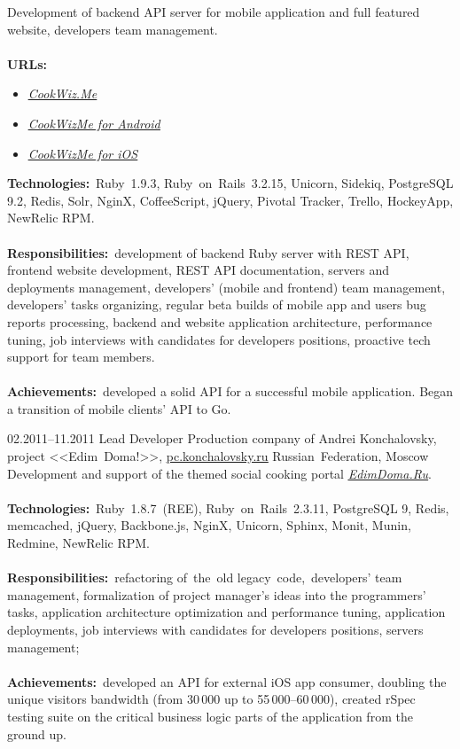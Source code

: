 \documentclass[12pt,a4paper,final]{moderncv}
\begin{document}
{
  Development of backend API server for mobile application and full featured website, developers team management.
  \\\\
  \textbf{URLs:}
  \begin{itemize}
    \item \underline{\href{https://cookwiz.me/}{\itshape CookWiz.Me}}
    \item \underline{\href{https://play.google.com/store/apps/details?id=com.cookwizme}{\itshape CookWizMe for Android}}
    \item \underline{\href{https://itunes.apple.com/app/id605764643}{\itshape CookWizMe for iOS}}
  \end{itemize}
  \bigskip
  \textbf{Technologies:}~Ruby~1.9.3, Ruby~on~Rails~3.2.15, Unicorn, Sidekiq, PostgreSQL 9.2, Redis, Solr, NginX, CoffeeScript, jQuery, Pivotal Tracker, Trello, HockeyApp, NewRelic RPM.
  \\\\
  \textbf{Responsibilities:}~development of backend Ruby server with REST API, frontend website development, REST API documentation, servers and deployments management, developers' (mobile and frontend) team management, developers' tasks organizing, regular beta builds of mobile app and users bug reports processing, backend and website application architecture, performance tuning, job interviews with candidates for developers positions, proactive tech support for team members.
  \\\\
  \textbf{Achievements:}~developed a solid API for a successful mobile application. Began a transition of mobile clients' API to Go.
}
%
\cventry
{02.2011--11.2011}
{Lead Developer}
{
  Production company of Andrei Konchalovsky, project <<Edim~Doma!>>, \underline{\href{http://pc.konchalovsky.ru}{pc.konchalovsky.ru}}
}
{Russian~Federation, Moscow}
{}
{
  Development and support of the themed social cooking portal \underline{\href{http://www.edimdoma.ru}{\itshape EdimDoma.Ru}}.
  \\\\
  \textbf{Technologies:}~Ruby~1.8.7~(REE), Ruby~on~Rails~2.3.11, PostgreSQL 9, Redis, memcached, jQuery, Backbone.js, NginX, Unicorn, Sphinx, Monit, Munin, Redmine, NewRelic RPM.
  \\\\
  \textbf{Responsibilities:}~refactoring of~the~old legacy~code,~developers' team management, formalization of project manager's ideas into the programmers' tasks, application architecture optimization and performance tuning, application deployments, job interviews with candidates for developers positions, servers management;
  \\\\
  \textbf{Achievements:}~developed an API for external iOS app consumer, doubling the unique visitors bandwidth (from 30\,000 up to 55\,000--60\,000), created rSpec testing suite on the critical business logic parts of the application from the ground up.
}
\end{document}
